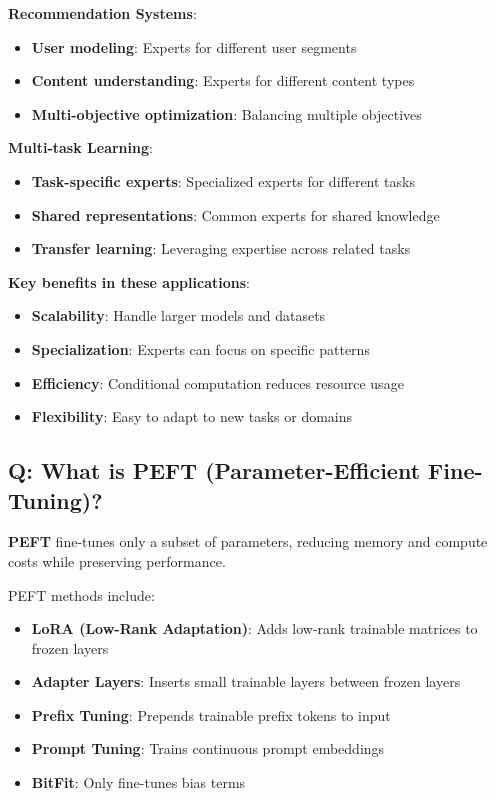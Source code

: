 \textbf{Recommendation Systems}:
\begin{itemize}
	\item \textbf{User modeling}: Experts for different user segments
	\item \textbf{Content understanding}: Experts for different content types
	\item \textbf{Multi-objective optimization}: Balancing multiple objectives
\end{itemize}

\textbf{Multi-task Learning}:
\begin{itemize}
	\item \textbf{Task-specific experts}: Specialized experts for different tasks
	\item \textbf{Shared representations}: Common experts for shared knowledge
	\item \textbf{Transfer learning}: Leveraging expertise across related tasks
\end{itemize}

\textbf{Key benefits in these applications}:
\begin{itemize}
	\item \textbf{Scalability}: Handle larger models and datasets
	\item \textbf{Specialization}: Experts can focus on specific patterns
	\item \textbf{Efficiency}: Conditional computation reduces resource usage
	\item \textbf{Flexibility}: Easy to adapt to new tasks or domains
\end{itemize}

\subsection*{Q: What is PEFT (Parameter-Efficient Fine-Tuning)?}
\textbf{PEFT} fine-tunes only a subset of parameters, reducing memory and compute costs while preserving performance.

PEFT methods include:
\begin{itemize}
	\item \textbf{LoRA (Low-Rank Adaptation)}: Adds low-rank trainable matrices to frozen layers
	\item \textbf{Adapter Layers}: Inserts small trainable layers between frozen layers
	\item \textbf{Prefix Tuning}: Prepends trainable prefix tokens to input
	\item \textbf{Prompt Tuning}: Trains continuous prompt embeddings
	\item \textbf{BitFit}: Only fine-tunes bias terms
\end{itemize}

